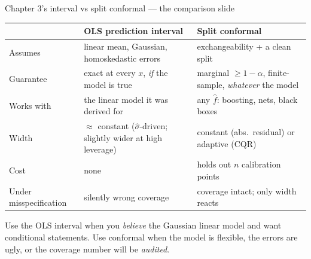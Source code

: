 \documentclass[aspectratio=169,11pt]{beamer}
\begin{document}
\begin{frame}{Chapter 3's interval vs split conformal --- the comparison slide}
  \footnotesize
  \begin{center}
  \begin{tabular}{@{}p{3.4cm}p{4.5cm}p{4.7cm}@{}}
    \toprule
    & \textbf{OLS prediction interval} & \textbf{Split conformal} \\
    \midrule
    Assumes & linear mean, Gaussian, homoskedastic errors & exchangeability + a clean
      split \\
    Guarantee & exact at every $x$, \emph{if} the model is true & marginal
      $\ge 1 - \alpha$, finite-sample, \emph{whatever} the model \\
    Works with & the linear model it was derived for & any $\hat f$: boosting, nets,
      black boxes \\
    Width & $\approx$ constant ($\hat\sigma$-driven; slightly wider at high leverage)
      & constant (abs.\ residual) or adaptive (CQR) \\
    Cost & none & holds out $n$ calibration points \\
    Under misspecification & silently wrong coverage & coverage intact; only width
      reacts \\
    \bottomrule
  \end{tabular}
  \end{center}
  \begin{takeaway}
    Use the OLS interval when you \emph{believe} the Gaussian linear model and want
    conditional statements. Use conformal when the model is flexible, the errors are
    ugly, or the coverage number will be \emph{audited}.
  \end{takeaway}
\end{frame}
\end{document}
